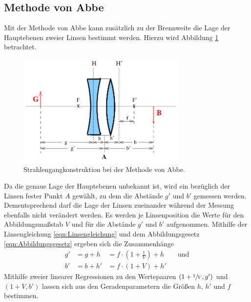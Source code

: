 \subsection{Methode von Abbe}

Mit der Methode von Abbe kann zusätzlich zu der Brennweite die Lage der Hauptebenen zweier Linsen bestimmt werden. 
Hierzu wird Abbildung \ref{fig:Abbe} betrachtet. 
\begin{figure}
    \centering
    \includegraphics[width=0.75\textwidth]{plots/2LinsenTeil2.png}
    \caption{Strahlengangkonstruktion bei der Methode von Abbe\cite{Versuchsanleitung}.}
    \label{fig:Abbe}
\end{figure}
Da die genaue Lage der Hauptebenen unbekannt ist, wird ein bezüglich der Linsen fester Punkt $A$ gewählt, zu dem die Abstände $g'$ und $b'$ gemessen werden. 
Dementsprechend darf die Lage der Linsen zueinander während der Messung ebenfalls nicht verändert werden.
Es werden je Linsenposition die Werte für den Abbildungsmaßstab $V$ und für die Abstände $g'$ und $b'$ aufgenommen. 
Mithilfe der Linsengleichung \eqref{eqn:Linsengleichung} und dem Abbildungsgesetz \eqref{eqn:Abbildungsgesetz} ergeben sich die Zusammenhänge 
\begin{align}
    g'&=g+h &=f\cdot (1+\frac{1}{V})+h \qquad \text{und}\\
    b'&=b+h'&=f\cdot (1+V)+h'
\end{align}
Mithilfe zweier linearer Regressionen zu den Wertepaaren $(1+\sfrac{1}{V},g')$ und $(1+V,b')$ lassen sich aus den Geradenparametern 
die Größen $h$, $h'$ und $f$ bestimmen\cite{Versuchsanleitung}. 
